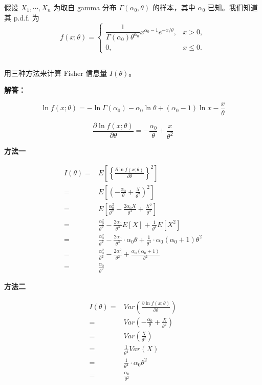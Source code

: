 \documentclass[12pt,a4paper]{article}
\begin{document}
假设 $X_1,\cdots,X_n$ 为取自 gamma 分布 $\Gamma(\alpha_0,\theta)$ 的样本，其中 $\alpha_0$ 已知。我们知道其 p.d.f. 为
\[
  f(x;\theta)=
  \begin{cases}
    \dfrac{1}{\Gamma(\alpha_0)\theta^{\alpha_0}}x^{\alpha_0-1}e^{-x/\theta}, & x>0,\\[0.4em]
    0, & x\le 0.
  \end{cases}
\]

\subsection{}

用三种方法来计算 Fisher 信息量 $I(\theta)$。

\begin{answerbox}
\textbf{解答：}

$$
\ln f(x; \theta) = -\ln \Gamma(\alpha_0) - \alpha_0 \ln \theta + (\alpha_0 - 1) \ln x - \frac{x}{\theta}
$$

$$
\frac{\partial \ln f(x; \theta)}{\partial \theta} = -\frac{\alpha_0}{\theta} + \frac{x}{\theta^2}
$$

\textbf{方法一}

$$
\begin{aligned}
I(\theta) = & E\left[\left\{\frac{\partial \ln f(x; \theta)}{\partial \theta}\right\}^2\right] \\
= & E\left[\left(-\frac{\alpha_0}{\theta} + \frac{X}{\theta^2}\right)^2\right] \\
= & E\left[\frac{\alpha_0^2}{\theta^2} - \frac{2\alpha_0 X}{\theta^3} + \frac{X^2}{\theta^4}\right] \\
= & \frac{\alpha_0^2}{\theta^2} - \frac{2\alpha_0}{\theta^3} E[X] + \frac{1}{\theta^4} E[X^2] \\
= & \frac{\alpha_0^2}{\theta^2} - \frac{2\alpha_0}{\theta^3} \cdot \alpha_0 \theta + \frac{1}{\theta^4} \cdot \alpha_0 (\alpha_0 + 1) \theta^2 \\
= & \frac{\alpha_0^2}{\theta^2} - \frac{2\alpha_0^2}{\theta^2} + \frac{\alpha_0 (\alpha_0 + 1)}{\theta^2} \\
= & \frac{\alpha_0}{\theta^2}
\end{aligned}
$$

\textbf{方法二}

$$
\begin{aligned}
I(\theta) = & Var\left(\frac{\partial \ln f(x; \theta)}{\partial \theta}\right) \\
= & Var\left(-\frac{\alpha_0}{\theta} + \frac{X}{\theta^2}\right) \\
= & Var\left(\frac{X}{\theta^2}\right) \\
= & \frac{1}{\theta^4} Var(X) \\
= & \frac{1}{\theta^4} \cdot \alpha_0 \theta^2 \\
= & \frac{\alpha_0}{\theta^2}
\end{aligned}
$$


\end{answerbox}
\end{document}
